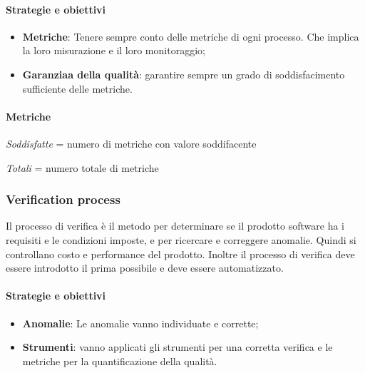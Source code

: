             \paragraph{Strategie e obiettivi}
            \begin{itemize}
                \item \textbf{Metriche}: Tenere sempre conto delle metriche di ogni processo. Che implica la loro misurazione e il loro monitoraggio;
                \item \textbf{Garanziaa della qualità}: garantire sempre un grado di soddisfacimento sufficiente delle metriche.
            \end{itemize}
            
            \paragraph{Metriche}
            \hphantom{}
            \def\productquality{
                {   Percentuale di metriche soddisfatte,
                    $\frac{Soddisfatte}{Totali}$,
                    $ \geq 60 \%$,
                    $ \geq 80 \% $
                },
            }
            
            
\textit{Soddisfatte} = numero di metriche con valore soddifacente

\textit{Totali} = numero totale di metriche
 
            \newpage
            \subsubsection{Verification process}
            Il processo di verifica è il metodo per determinare se il prodotto software ha i requisiti e le condizioni imposte, e per ricercare e correggere anomalie. Quindi si controllano costo e performance del prodotto. Inoltre il processo di verifica deve essere introdotto il prima possibile e deve essere automatizzato.
            
            \paragraph{Strategie e obiettivi}
            \begin{itemize}
                \item \textbf{Anomalie}: Le anomalie vanno individuate e corrette;
                \item \textbf{Strumenti}: vanno applicati gli strumenti per una corretta verifica e le metriche per la quantificazione della qualità.
            \end{itemize}
            
